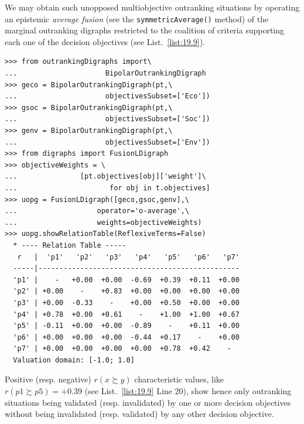 We may obtain such unopposed multiobjective outranking situations by operating an epistemic \emph{average fusion} (see the \texttt{symmetricAverage()} method) of the marginal outranking digraphs restricted to the coalition of criteria supporting each one of the decision objectives (see List.~\vref{list:19.9}).
\begin{lstlisting}[caption={Computing unopposed outranking situations},label=list:19.9]
>>> from outrankingDigraphs import\
...                     BipolarOutrankingDigraph
>>> geco = BipolarOutrankingDigraph(pt,\
...                     objectivesSubset=['Eco'])
>>> gsoc = BipolarOutrankingDigraph(pt,\
...                     objectivesSubset=['Soc'])
>>> genv = BipolarOutrankingDigraph(pt,\
...                     objectivesSubset=['Env'])
>>> from digraphs import FusionLDigraph
>>> objectiveWeights = \
...               [pt.objectives[obj]['weight']\
...                      for obj in t.objectives] 
>>> uopg = FusionLDigraph([geco,gsoc,genv],\
...                   operator='o-average',\
...                   weights=objectiveWeights)
>>> uopg.showRelationTable(ReflexiveTerms=False)
  * ---- Relation Table -----
   r   |  'p1'   'p2'   'p3'   'p4'   'p5'   'p6'   'p7'   
  -----|------------------------------------------------
  'p1' |    -   +0.00  +0.00  -0.69  +0.39  +0.11  +0.00  
  'p2' | +0.00    -    +0.83  +0.00  +0.00  +0.00  +0.00  
  'p3' | +0.00  -0.33    -    +0.00  +0.50  +0.00  +0.00  
  'p4' | +0.78  +0.00  +0.61    -    +1.00  +1.00  +0.67  
  'p5' | -0.11  +0.00  +0.00  -0.89    -    +0.11  +0.00  
  'p6' | +0.00  +0.00  +0.00  -0.44  +0.17    -    +0.00  
  'p7' | +0.00  +0.00  +0.00  +0.00  +0.78  +0.42    -   
  Valuation domain: [-1.0; 1.0]
\end{lstlisting}

Positive (resp. negative) $r(x \succsim y)$ characteristic values, like $r(p1 \succsim p5) = +0.39$ (see List.~\vref{list:19.9} Line 20), show hence only outranking situations being validated (resp. invalidated) by one or more decision objectives without being invalidated (resp. validated) by any other decision objective.

